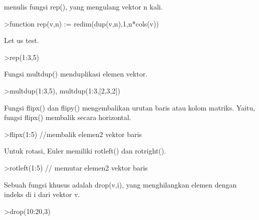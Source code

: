 \documentclass[a4paper,10pt]{article}
\begin{document}
\begin{eulernotebook}
\begin{eulercomment}
\begin{eulercomment}
\begin{eulercomment}
\begin{eulercomment}
\begin{eulercomment}
\begin{eulercomment}
\begin{eulercomment}
menulis fungsi rep(), yang mengulang vektor n kali.
\end{eulercomment}
\begin{eulerprompt}
>function rep(v,n) := redim(dup(v,n),1,n*cols(v))
\end{eulerprompt}
\begin{eulercomment}
Let us test.
\end{eulercomment}
\begin{eulerprompt}
>rep(1:3,5)
\end{eulerprompt}
\begin{euleroutput}
  [1,  2,  3,  1,  2,  3,  1,  2,  3,  1,  2,  3,  1,  2,  3]
\end{euleroutput}
\begin{eulercomment}
Fungsi multdup() menduplikasi elemen vektor.
\end{eulercomment}
\begin{eulerprompt}
>multdup(1:3,5), multdup(1:3,[2,3,2])
\end{eulerprompt}
\begin{euleroutput}
  [1,  1,  1,  1,  1,  2,  2,  2,  2,  2,  3,  3,  3,  3,  3]
  [1,  1,  2,  2,  2,  3,  3]
\end{euleroutput}
\begin{eulercomment}
Fungsi flipx() dan flipy() mengembalikan urutan baris atau kolom
matriks. Yaitu, fungsi flipx() membalik secara horizontal.
\end{eulercomment}
\begin{eulerprompt}
>flipx(1:5) //membalik elemen2 vektor baris
\end{eulerprompt}
\begin{euleroutput}
  [5,  4,  3,  2,  1]
\end{euleroutput}
\begin{eulercomment}
Untuk rotasi, Euler memiliki rotleft() dan rotright().
\end{eulercomment}
\begin{eulerprompt}
>rotleft(1:5) // memutar elemen2 vektor baris
\end{eulerprompt}
\begin{euleroutput}
  [2,  3,  4,  5,  1]
\end{euleroutput}
\begin{eulercomment}
Sebuah fungsi khusus adalah drop(v,i), yang menghilangkan elemen
dengan indeks di i dari vektor v.
\end{eulercomment}
\begin{eulerprompt}
>drop(10:20,3)
\end{eulerprompt}

\end{eulercomment}
\end{eulercomment}
\end{eulercomment}
\end{eulercomment}
\end{eulercomment}
\end{eulercomment}
\end{eulernotebook}
\end{document}
